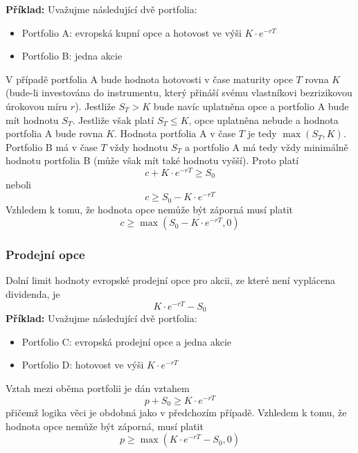 \documentclass[a4paper]{book}
\begin{document}
\noindent \textbf{Příklad:} Uvažujme následující dvě portfolia:
\begin{itemize}
\item Portfolio A: evropská kupní opce a hotovost ve výši $K \cdot e^{-rT}$
\item Portfolio B: jedna akcie
\end{itemize}
V případě portfolia A bude hodnota hotovosti v čase maturity opce $T$ rovna $K$ (bude-li investována do instrumentu, který přináší svému vlastníkovi bezrizikovou úrokovou míru $r$). Jestliže $S_T>K$ bude navíc uplatněna opce a portfolio A bude mít hodnotu $S_T$. Jestliže však platí $S_T \le K$, opce uplatněna nebude a hodnota portfolia A bude rovna $K$. Hodnota portfolia A v čase $T$ je tedy $\max(S_T, K)$.\\
Portfolio B má v čase $T$ vždy hodnotu $S_T$ a portfolio A má tedy vždy minimálně hodnotu portfolia B (může však mít také hodnotu vyšší). Proto platí
\begin{equation*}
c+K \cdot e^{-rT} \ge S_0
\end{equation*}
neboli
\begin{equation*}
c \ge S_0 - K \cdot e^{-rT}
\end{equation*}
Vzhledem k tomu, že hodnota opce nemůže být záporná musí platit
\begin{equation*}
c \ge \max(S_0 - K \cdot e^{-rT},0)
\end{equation*}

\subsubsection{Prodejní opce}

Dolní limit hodnoty evropské prodejní opce pro akcii, ze které není vyplácena dividenda, je
\begin{equation*}
K \cdot e^{-rT} - S_0
\end{equation*}
\textbf{Příklad:} Uvažujme následující dvě portfolia:
\begin{itemize}
\item Portfolio C: evropská prodejní opce a jedna akcie
\item Portfolio D: hotovost ve výši $K \cdot e^{-rT}$
\end{itemize}
Vztah mezi oběma portfolii je dán vztahem
\begin{equation*}
p+S_0 \ge K \cdot e^{-rT}
\end{equation*}
přičemž logika věci je obdobná jako v předchozím případě. Vzhledem k tomu, že hodnota opce nemůže být záporná, musí platit
\begin{equation*}
p \ge \max(K \cdot e^{-rT} - S_0, 0)
\end{equation*}
\end{document}
